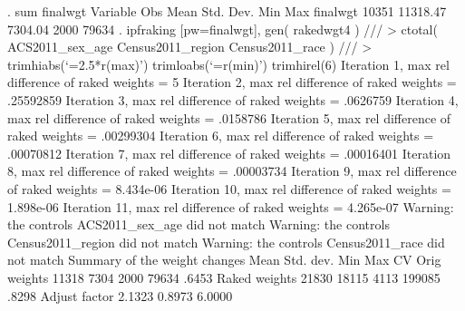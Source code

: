 . sum finalwgt
{\smallskip}
    Variable {\VBAR}       Obs        Mean    Std. Dev.       Min        Max
    finalwgt {\VBAR}     10351    11318.47     7304.04       2000      79634
{\smallskip}
. ipfraking [pw=finalwgt], gen( rakedwgt4 ) ///
>     ctotal( ACS2011_sex_age Census2011_region Census2011_race ) ///
>     trimhiabs(`=2.5*r(max)') trimloabs(`=r(min)') trimhirel(6)
{\smallskip}
\cnp
 Iteration 1, max rel difference of raked weights = 5
 Iteration 2, max rel difference of raked weights = .25592859
 Iteration 3, max rel difference of raked weights = .0626759
 Iteration 4, max rel difference of raked weights = .0158786
 Iteration 5, max rel difference of raked weights = .00299304
 Iteration 6, max rel difference of raked weights = .00070812
 Iteration 7, max rel difference of raked weights = .00016401
 Iteration 8, max rel difference of raked weights = .00003734
 Iteration 9, max rel difference of raked weights = 8.434e-06
 Iteration 10, max rel difference of raked weights = 1.898e-06
 Iteration 11, max rel difference of raked weights = 4.265e-07
Warning: the controls ACS2011_sex_age did not match
Warning: the controls Census2011_region did not match
Warning: the controls Census2011_race did not match
{\smallskip}
   Summary of the weight changes
{\smallskip}
              {\VBAR}    Mean    Std. dev.    Min        Max       CV
Orig weights  {\VBAR}    11318       7304      2000       79634   .6453
Raked weights {\VBAR}    21830      18115      4113      199085   .8298
Adjust factor {\VBAR}   2.1323               0.8973      6.0000
{\smallskip}
